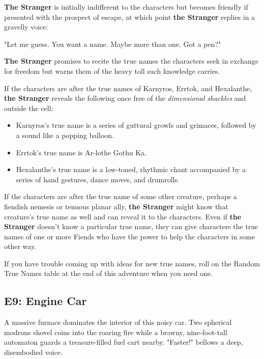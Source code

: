 \documentclass[10pt,a4paper,twoside,bg=print,twocolumn,openany,nodeprecatedcode]{dndarticle}
\begin{document}
\textbf{The Stranger} is initially indifferent to the characters but becomes friendly if presented with the prospect of escape, at which point \textbf{the Stranger} replies in a gravelly voice:

\begin{DndReadAloud}{}
"Let me guess. You want a name. Maybe more than one. Got a pen?"

\end{DndReadAloud}

\textbf{The Stranger} promises to recite the true names the characters seek in exchange for freedom but warns them of the heavy toll such knowledge carries.

If the characters are after the true names of Karnyros, Errtok, and Hexalanthe, \textbf{the Stranger} reveals the following once free of the \textit{dimensional shackles} and outside the cell:


\begin{itemize}
\item Karnyros's true name is a series of guttural growls and grimaces, followed by a sound like a popping balloon.
\item Errtok's true name is Ar-lothe Gothu Ka.
\item Hexalanthe's true name is a low-toned, rhythmic chant accompanied by a series of hand gestures, dance moves, and drumrolls.
\end{itemize}

If the characters are after the true name of some other creature, perhaps a fiendish nemesis or tenuous planar ally, \textbf{the Stranger} might know that creature's true name as well and can reveal it to the characters. Even if \textbf{the Stranger} doesn't know a particular true name, they can give characters the true names of one or more Fiends who have the power to help the characters in some other way.

If you have trouble coming up with ideas for new true names, roll on the Random True Names table at the end of this adventure when you need one.

\subsection{E9: Engine Car}
\begin{DndReadAloud}{}
A massive furnace dominates the interior of this noisy car. Two spherical modrons shovel coins into the roaring fire while a brawny, nine-foot-tall automaton guards a treasure-filled fuel cart nearby. "Faster!" bellows a deep, disembodied voice.

\end{DndReadAloud}
\end{document}

